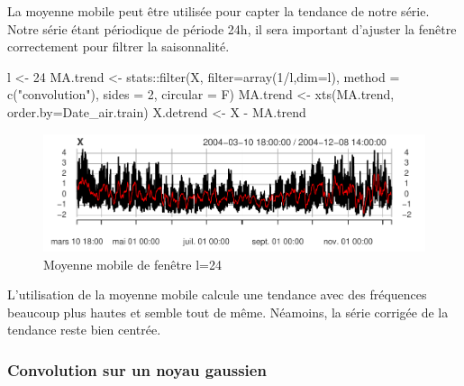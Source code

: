 \documentclass[
]{article}
\newenvironment{Shaded}{\begin{snugshade}}{\end{snugshade}}
\newcommand{\AttributeTok}[1]{\textcolor[rgb]{0.77,0.63,0.00}{#1}}
\newcommand{\DecValTok}[1]{\textcolor[rgb]{0.00,0.00,0.81}{#1}}
\newcommand{\FunctionTok}[1]{\textcolor[rgb]{0.00,0.00,0.00}{#1}}
\newcommand{\NormalTok}[1]{#1}
\newcommand{\OtherTok}[1]{\textcolor[rgb]{0.56,0.35,0.01}{#1}}
\newcommand{\SpecialCharTok}[1]{\textcolor[rgb]{0.00,0.00,0.00}{#1}}
\newcommand{\StringTok}[1]{\textcolor[rgb]{0.31,0.60,0.02}{#1}}
\begin{document}
La moyenne mobile peut être utilisée pour capter la tendance de notre
série. Notre série étant périodique de période 24h, il sera important
d'ajuster la fenêtre correctement pour filtrer la saisonnalité.

\begin{Shaded}
\begin{Highlighting}[]
\NormalTok{l }\OtherTok{\textless{}{-}} \DecValTok{24}
\NormalTok{MA.trend }\OtherTok{\textless{}{-}}\NormalTok{ stats}\SpecialCharTok{::}\FunctionTok{filter}\NormalTok{(X, }\AttributeTok{filter=}\FunctionTok{array}\NormalTok{(}\DecValTok{1}\SpecialCharTok{/}\NormalTok{l,}\AttributeTok{dim=}\NormalTok{l),}
                  \AttributeTok{method =} \FunctionTok{c}\NormalTok{(}\StringTok{"convolution"}\NormalTok{),}
                  \AttributeTok{sides =} \DecValTok{2}\NormalTok{, }\AttributeTok{circular =}\NormalTok{ F)}
\NormalTok{MA.trend }\OtherTok{\textless{}{-}} \FunctionTok{xts}\NormalTok{(MA.trend, }\AttributeTok{order.by=}\NormalTok{Date\_air.train)}
\NormalTok{X.detrend }\OtherTok{\textless{}{-}}\NormalTok{ X }\SpecialCharTok{{-}}\NormalTok{ MA.trend}
\end{Highlighting}
\end{Shaded}

\begin{figure}

{\centering \includegraphics{STA202_report_files/figure-latex/ma-1} 

}

\caption{\label{fig:ma} Moyenne mobile de fenêtre l=24}\label{fig:ma}
\end{figure}

L'utilisation de la moyenne mobile calcule une tendance avec des
fréquences beaucoup plus hautes et semble tout de même. Néamoins, la
série corrigée de la tendance reste bien centrée.

\hypertarget{convolution-sur-un-noyau-gaussien}{%
\subsubsection{Convolution sur un noyau
gaussien}\label{convolution-sur-un-noyau-gaussien}}
\end{document}
